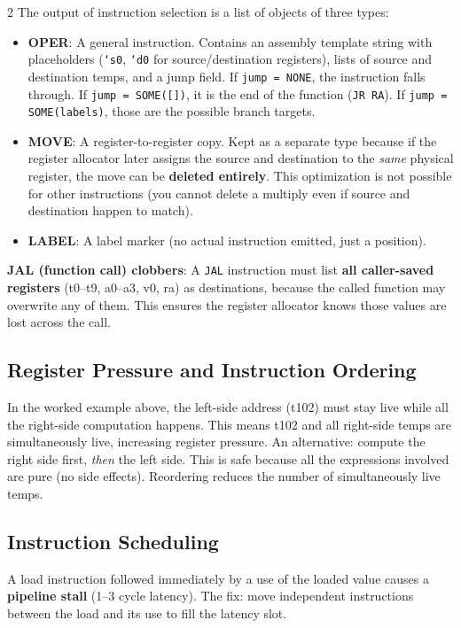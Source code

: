 \documentclass[9pt,landscape]{extarticle}
\begin{document}
\begin{multicols}{2}
The output of instruction selection is a list of objects of three types:
\begin{itemize}
  \item \textbf{OPER}: A general instruction. Contains an assembly template string with placeholders (\texttt{`s0}, \texttt{`d0} for source/destination registers), lists of source and destination temps, and a jump field. If \texttt{jump = NONE}, the instruction falls through. If \texttt{jump = SOME([])}, it is the end of the function (\texttt{JR RA}). If \texttt{jump = SOME(labels)}, those are the possible branch targets.
  \item \textbf{MOVE}: A register-to-register copy. Kept as a separate type because if the register allocator later assigns the source and destination to the \emph{same} physical register, the move can be \textbf{deleted entirely}. This optimization is not possible for other instructions (you cannot delete a multiply even if source and destination happen to match).
  \item \textbf{LABEL}: A label marker (no actual instruction emitted, just a position).
\end{itemize}

\textbf{JAL (function call) clobbers}: A \texttt{JAL} instruction must list \textbf{all caller-saved registers} (t0--t9, a0--a3, v0, ra) as destinations, because the called function may overwrite any of them. This ensures the register allocator knows those values are lost across the call.

\subsection{Register Pressure and Instruction Ordering}

In the worked example above, the left-side address (t102) must stay live while all the right-side computation happens. This means t102 and all right-side temps are simultaneously live, increasing register pressure. An alternative: compute the right side first, \emph{then} the left side. This is safe because all the expressions involved are pure (no side effects). Reordering reduces the number of simultaneously live temps.

\subsection{Instruction Scheduling}

A load instruction followed immediately by a use of the loaded value causes a \textbf{pipeline stall} (1--3 cycle latency). The fix: move independent instructions between the load and its use to fill the latency slot.


\end{multicols}
\end{document}
